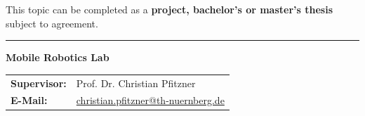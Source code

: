 \documentclass{ohm_project_description}
\begin{document}
\vspace{0.5cm}
This topic can be completed as a \textbf{project, bachelor's or master's thesis} subject to agreement.

\vfill
\textcolor{ohm_red}{\rule{\linewidth}{0.4mm}}
\textbf{\textcolor{ohm_red}{Mobile Robotics Lab}} \\
\begin{tabular}{@{}ll}
\textbf{Supervisor:} & Prof. Dr. Christian Pfitzner \\
\textbf{E-Mail:}     & \href{mailto:christian.pfitzner@th-nuernberg.de}{christian.pfitzner@th-nuernberg.de} \\
\end{tabular}
\end{document}
